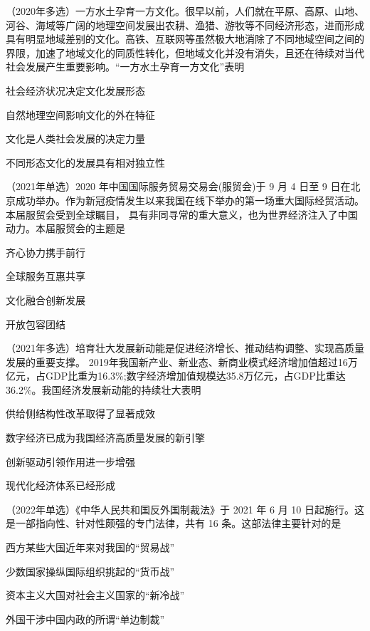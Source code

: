 \documentclass[lang=cn,blue,10pt,scheme=chinese,twocol]{zznote}
\begin{document}
\begin{example}	（2020年多选）一方水土孕育一方文化。很早以前，人们就在平原、高原、山地、河谷、海域等广阔的地理空间发展出农耕、渔猎、游牧等不同经济形态，进而形成具有明显地域差别的文化。高铁、互联网等虽然极大地消除了不同地域空间之间的界限，加速了地域文化的同质性转化，但地域文化并没有消失，且还在待续对当代社会发展产生重要影响。“一方水土孕育一方文化”表明
	\begin{choice}
		\item 社会经济状况决定文化发展形态
		\item 自然地理空间影响文化的外在特征
		\item 文化是人类社会发展的决定力量
		\item 不同形态文化的发展具有相对独立性
	\end{choice}
\end{example}



\begin{example}
	（2021年单选）2020 年中国国际服务贸易交易会(服贸会)于 9 月 4 日至 9 日在北京成功举办。作为新冠疫情发生以来我国在线下举办的第一场重大国际经贸活动。本届服贸会受到全球瞩目， 具有非同寻常的重大意义，也为世界经济注入了中国动力。本届服贸会的主题是
	\begin{choice}
		\item 齐心协力携手前行
		\item 全球服务互惠共享
		\item 文化融合创新发展
		\item 开放包容团结
	\end{choice}
\end{example}


\begin{example}
	（2021年多选）培育壮大发展新动能是促进经济增长、推动结构调整、实现高质量发展的重要支撑。
	2019年我国新产业、新业态、新商业模式经济增加值超过16万亿元，占GDP比重为16.3\%;数字经济增加值规模达35.8万亿元，占GDP比重达36.2\%。我国经济发展新动能的持续壮大表明
	\begin{choice}
		\item 供给侧结构性改革取得了显著成效
		\item 数字经济已成为我国经济高质量发展的新引擎
		\item 创新驱动引领作用进一步增强
		\item 现代化经济体系已经形成
	\end{choice}

\end{example}


\begin{example} （2022年单选）《中华人民共和国反外国制裁法》于 2021 年 6 月 10 日起施行。这是一部指向性、针对性颇强的专门法律，共有 16 条。这部法律主要针对的是
	\begin{choice}
		\item 西方某些大国近年来对我国的“贸易战”
		\item 少数国家操纵国际组织挑起的“货币战”
		\item 资本主义大国对社会主义国家的“新冷战”
		\item 外国干涉中国内政的所谓“单边制裁”
	\end{choice}
\end{example}
\end{document}
